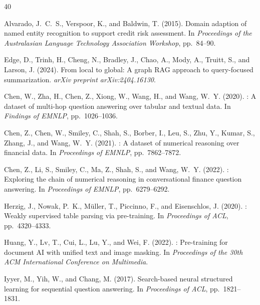 \documentclass[11pt]{article}
\begin{document}

\begin{thebibliography}{40}

Alvarado, J.~C.~S., Verspoor, K., and Baldwin, T. (2015).
\newblock Domain adaption of named entity recognition to support credit risk
  assessment.
\newblock In \emph{Proceedings of the Australasian Language Technology
  Association Workshop}, pp.~84--90.

Edge, D., Trinh, H., Cheng, N., Bradley, J., Chao, A., Mody, A.,
  Truitt, S., and Larson, J. (2024).
\newblock From local to global: A graph {RAG} approach to query-focused
  summarization.
\newblock \emph{arXiv preprint arXiv:2404.16130}.

Chen, W., Zha, H., Chen, Z., Xiong, W., Wang, H., and Wang, W.~Y. (2020).
: A dataset of multi-hop question answering over tabular
  and textual data.
\newblock In \emph{Findings of EMNLP}, pp.~1026--1036.

Chen, Z., Chen, W., Smiley, C., Shah, S., Borber, I., Leu, S., Zhu, Y.,
  Kumar, S., Zhang, J., and Wang, W.~Y. (2021).
: A dataset of numerical reasoning over financial data.
\newblock In \emph{Proceedings of EMNLP}, pp.~7862--7872.

Chen, Z., Li, S., Smiley, C., Ma, Z., Shah, S., and Wang, W.~Y. (2022).
: Exploring the chain of numerical reasoning in
  conversational finance question answering.
\newblock In \emph{Proceedings of EMNLP}, pp.~6279--6292.

Herzig, J., Nowak, P.~K., M\"uller, T., Piccinno, F., and
  Eisenschlos, J. (2020).
: Weakly supervised table parsing via pre-training.
\newblock In \emph{Proceedings of ACL}, pp.~4320--4333.

Huang, Y., Lv, T., Cui, L., Lu, Y., and Wei, F. (2022).
: Pre-training for document {AI} with unified text and
  image masking.
\newblock In \emph{Proceedings of the 30th ACM International Conference on
  Multimedia}.

Iyyer, M., Yih, W., and Chang, M. (2017).
\newblock Search-based neural structured learning for sequential question
  answering.
\newblock In \emph{Proceedings of ACL}, pp.~1821--1831.


\end{thebibliography}
\end{document}
